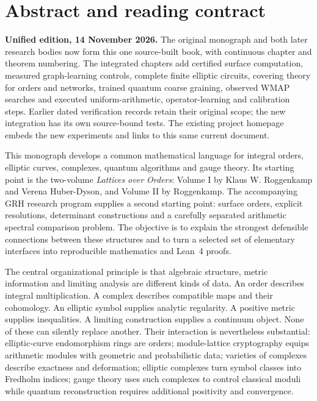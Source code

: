 \chapter*{Abstract and reading contract}
\noindent\textbf{Unified edition, 14 November 2026.} The original monograph and both later research bodies now form this one source-built book, with continuous chapter and theorem numbering. The integrated chapters add certified surface computation, measured graph-learning controls, complete finite elliptic circuits, covering theory for orders and networks, trained quantum coarse graining, observed WMAP searches and executed uniform-arithmetic, operator-learning and calibration steps. Earlier dated verification records retain their original scope; the new integration has its own source-bound tests. The existing project homepage embeds the new experiments and links to this same current document.

This monograph develops a common mathematical language for integral orders, elliptic curves, complexes, quantum algorithms and gauge theory. Its starting point is the two-volume \emph{Lattices over Orders}: Volume I by Klaus W. Roggenkamp and Verena Huber-Dyson, and Volume II by Roggenkamp. The accompanying GRH research program supplies a second starting point: surface orders, explicit resolutions, determinant constructions and a carefully separated arithmetic spectral comparison problem. The objective is to explain the strongest defensible connections between these structures and to turn a selected set of elementary interfaces into reproducible mathematics and Lean~4 proofs.

The central organizational principle is that algebraic structure, metric information and limiting analysis are different kinds of data. An order describes integral multiplication. A complex describes compatible maps and their cohomology. An elliptic symbol supplies analytic regularity. A positive metric supplies inequalities. A limiting construction supplies a continuum object. None of these can silently replace another. Their interaction is nevertheless substantial: elliptic-curve endomorphism rings are orders; module-lattice cryptography equips arithmetic modules with geometric and probabilistic data; varieties of complexes describe exactness and deformation; elliptic complexes turn symbol classes into Fredholm indices; gauge theory uses such complexes to control classical moduli while quantum reconstruction requires additional positivity and convergence.

